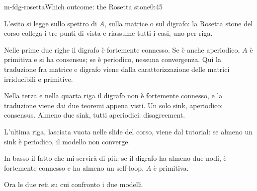 \begin{slide}{m-fdg-rosetta}{Which outcome: the Rosetta stone}{0:45}
  \begin{discorso}
    \item L'esito si legge sullo spettro di $A$, sulla matrice o sul digrafo: la Rosetta stone del corso collega i tre punti di vista e riassume tutti i casi, uno per riga.
    \item Nelle prime due righe il digrafo è fortemente connesso. Se è anche aperiodico, $A$ è primitiva e si ha consensus; se è periodico, nessuna convergenza. Qui la traduzione fra matrice e digrafo viene dalla caratterizzazione delle matrici irriducibili e primitive.
    \item Nella terza e nella quarta riga il digrafo non è fortemente connesso, e la traduzione viene dai due teoremi appena visti. Un solo sink, aperiodico: consensus. Almeno due sink, tutti aperiodici: disagreement.
    \item L'ultima riga, lasciata vuota nelle slide del corso, viene dal tutorial: se almeno un sink è periodico, il modello non converge.
    \item In basso il fatto che mi servirà di più: se il digrafo ha almeno due nodi, è fortemente connesso e ha almeno un self-loop, $A$ è primitiva.
    \item Ora le due reti su cui confronto i due modelli.
  \end{discorso}
\end{slide}

